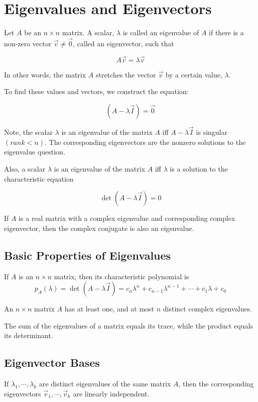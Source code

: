 \section{Eigenvalues and Eigenvectors}

Let $A$ be an $n \times n$ matrix. A scalar, $\lambda$ is called an eigenvalue of $A$ if there is a non-zero vector $\vec{v} \neq \vec{0}$, called an eigenvector, such that

    \[ A \vec{v} = \lambda \vec{v} \]

In other words, the matrix $A$ stretches the vector $\vec{v}$ by a certain value, $\lambda$.

To find these values and vectors, we construct the equation:

    \[ (A - \lambda \vec{I}) = \vec{0} \]

Note, the scalar $\lambda$ is an eigenvalue of the matrix $A$ iff $A - \lambda \vec{I}$ is singular $(rank < n)$. The corresponding eigenvectors are the nonzero solutions to the eigenvalue question.

Also, a scalar $\lambda$ is an eigenvalue of the matrix $A$ iff $\lambda$ is a solution to the characteristic equation

    \[ \det(A - \lambda \vec{I}) = 0 \]

If $A$ is a real matrix with a complex eigenvalue and corresponding complex eigenvector, then the complex conjugate is also an eigenvalue.

    \subsection{Basic Properties of Eigenvalues}
    If $A$ is an $n \times n$ matrix, then its characteristic polynomial is
        \[ p_A(\lambda) = \det(A - \lambda \vec{I}) = c_n \lambda^n + c_{n-1}\lambda^{n-1} + \cdots + c_1 \lambda + c_0 \]

    An $n \times n$ matrix $A$ has at least one, and at most $n$ distinct complex eigenvalues.

    The sum of the eigenvalues of a matrix equals its trace, while the product equals its determinant.

    \subsection{Eigenvector Bases}
    If $\lambda_1, \cdots, \lambda_k$ are distinct eigenvalues of the same matrix $A$, then the corresponding eigenvectors $\vec{v}_1, \cdots, \vec{v}_k$ are linearly independent.

